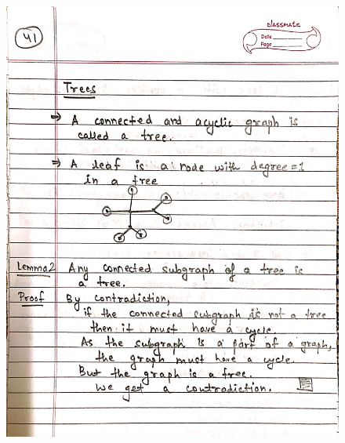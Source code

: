 \begin{figure}[H]
    \centering
    \includegraphics[width=16cm, height=21cm]{"./MIT-6.042J/MIT-6042J-041"}
\end{figure}
\newpage
